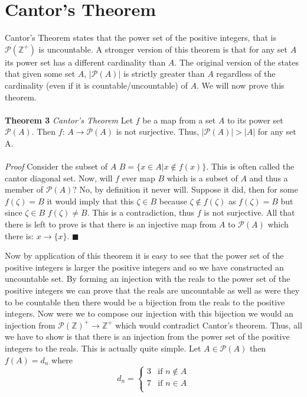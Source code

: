 \documentclass{article}
\begin{document}
\section{Cantor's Theorem}
\par Cantor's Theorem states that the power set of the positive integers, that is $\mathcal{P}(\mathbb{Z}^{+})$ is uncountable. A stronger version of this theorem is that for any set $A$ its power set has a different cardinality than $A$. The original version of the states that given some set $A$, $|\mathcal{P}(A)|$ is strictly greater than $A$ regardless of the cardinality (even if it is countable/uncountable) of $A$. We will now prove this theorem.
\\
\\
\textbf{Theorem 3} \textit{Cantor's Theorem} Let $f$ be a map from a set $A$ to its power set $\mathcal{P}(A)$. Then $f$: $A \to \mathcal{P}(A)$ is not surjective. Thus, $|\mathcal{P}(A)| > |A|$ for any set A. 
\\
\\
\textit{Proof} Consider the subset of $A$ $B=\{x \in A | x \not \in f(x)\}$. This is often called the cantor diagonal set. Now, will $f$ ever map $B$ which is a subset of $A$ and thus a member of $\mathcal{P}(A)$? No, by definition it never will. Suppose it did, then for some $f(\zeta)=B$ it would imply that this $\zeta \in B$ because $\zeta \not \in f(\zeta)$ as $f(\zeta)=B$ but since $\zeta \in B$ $f(\zeta) \not = B$. This is a contradiction, thus $f$ is not surjective. All that there is left to prove is that there is an injective map from $A$ to $\mathcal{P}(A)$ which there is: $x \to \{x\}$. $\blacksquare$
\\
\par Now by application of this theorem it is easy to see that the power set of the positive integers is larger the positive integers and so we have constructed an uncountable set. By forming an injection with the reals to the power set of the positive integers we can prove that the reals are uncountable as well as were they to be countable then there would be a bijection from the reals to the positive integers. Now were we to compose our injection with this bijection we would an injection from $\mathcal{P}(\mathbb{Z})^{+} \to \mathbb{Z}^{+}$ which would contradict Cantor's theorem. Thus, all we have to show is that there is an injection from the power set of the positive integers to the reals. This is actually quite simple. Let $A \in \mathcal{P}(A)$ then $f(A)=d_{n}$ where
\[
d_{n}= \begin{cases}
3 & \text{if } n \not \in A \\
7 & \text{if } n \in A \\
\end{cases}
\]
\end{document}

